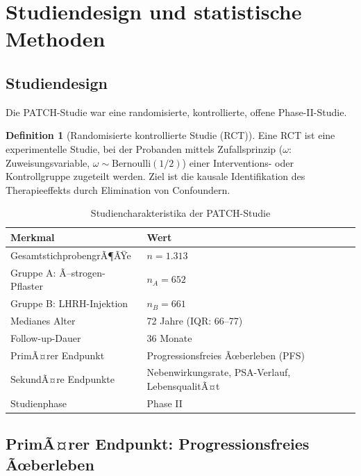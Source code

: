 ﻿\documentclass[a4paper,12pt]{article}
\theoremstyle{definition}
\newtheorem{definition}{Definition}
\begin{document}
\section{Studiendesign und statistische Methoden}

\subsection{Studiendesign}

Die PATCH-Studie war eine randomisierte, kontrollierte, offene Phase-II-Studie.

\begin{definition}[Randomisierte kontrollierte Studie (RCT)]
Eine RCT ist eine experimentelle Studie, bei der Probanden mittels Zufallsprinzip ($\omega$: Zuweisungsvariable, $\omega \sim \mathrm{Bernoulli}(1/2)$) einer Interventions- oder Kontrollgruppe zugeteilt werden.
Ziel ist die kausale Identifikation des Therapieeffekts durch Elimination von Confoundern.
\end{definition}

\begin{table}[h!]
\centering
\caption{Studiencharakteristika der PATCH-Studie}
\label{tab:studie}
\begin{tabular}{ll}
\toprule
\textbf{Merkmal} & \textbf{Wert} \\
\midrule
GesamtstichprobengrÃ¶ÃŸe & $n = 1.313$ \\
Gruppe A: Ã–strogen-Pflaster & $n_A = 652$ \\
Gruppe B: LHRH-Injektion & $n_B = 661$ \\
Medianes Alter & 72 Jahre (IQR: 66--77) \\
Follow-up-Dauer & 36 Monate \\
PrimÃ¤rer Endpunkt & Progressionsfreies Ãœberleben (PFS) \\
SekundÃ¤re Endpunkte & Nebenwirkungsrate, PSA-Verlauf, LebensqualitÃ¤t \\
Studienphase & Phase II \\
\bottomrule
\end{tabular}
\end{table}

\subsection{PrimÃ¤rer Endpunkt: Progressionsfreies Ãœberleben}
\end{document}
